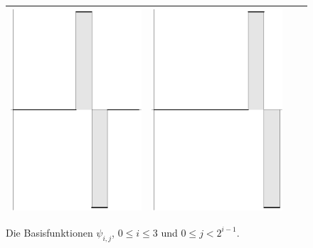 \begin{figure}
\begin{tabular}{|c|c|c|c|}
\includegraphics[width=0.22\hsize]{images/w-13}&%
\includegraphics[width=0.22\hsize]{images/w-14}\\
\hline
\end{tabular}
\caption{Die Basisfunktionen $\psi_{i,j}$, $0\le i\le 3$ und $0\le j<2^{i-1}$.}
\end{figure}

